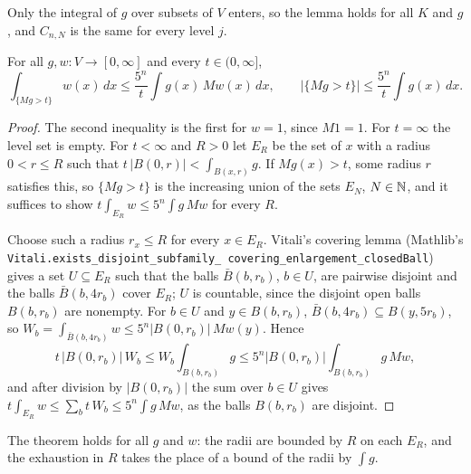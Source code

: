 Only the integral of $g$ over subsets of $V$ enters, so the lemma holds for all $K$ and $g$, and
$C_{n,N}$ is the same for every level $j$.

\begin{theorem}
\label{thm:maximal-weak-type}
\leanok
{}
For all $g, w : V \to [0, \infty]$ and every $t \in (0, \infty]$,
\[
  \int_{\{M g > t\}} w(x) \, dx \leq \frac{5^n}{t} \int g(x) \, M w(x) \, dx,
  \qquad
  |\{M g > t\}| \leq \frac{5^n}{t} \int g(x) \, dx .
\]
\end{theorem}

\begin{proof}
\leanok
The second inequality is the first for $w = 1$, since $M 1 = 1$. For $t = \infty$ the level set
is empty. For $t < \infty$ and $R > 0$ let $E_R$ be the set of $x$ with a radius
$0 < r \leq R$ such that $t \, |B(0, r)| < \int_{B(x, r)} g$. If $M g(x) > t$, some radius
$r$ satisfies this, so $\{M g > t\}$ is the increasing union of the sets $E_N$, $N \in \mathbb{N}$, and
it suffices to show $t \int_{E_R} w \leq 5^n \int g \, M w$ for every $R$.

Choose such a radius $r_x \leq R$ for every $x \in E_R$. Vitali's covering lemma (Mathlib's
\texttt{Vitali.\allowbreak exists\_disjoint\_subfamily\_\allowbreak
covering\_enlargement\_closedBall}) gives a
set $U \subseteq E_R$ such that the balls $\bar B(b, r_b)$, $b \in U$, are pairwise disjoint and
the balls $\bar B(b, 4 r_b)$ cover $E_R$; $U$ is countable, since the disjoint open balls
$B(b, r_b)$ are nonempty. For $b \in U$ and $y \in B(b, r_b)$,
$\bar B(b, 4 r_b) \subseteq B(y, 5 r_b)$, so
$W_b = \int_{\bar B(b, 4 r_b)} w \leq 5^n |B(0, r_b)| \, M w(y)$. Hence
\[
  t \, |B(0, r_b)| \, W_b \leq W_b \int_{B(b, r_b)} g
  \leq 5^n |B(0, r_b)| \int_{B(b, r_b)} g \, M w ,
\]
and after division by $|B(0, r_b)|$ the sum over $b \in U$ gives
$t \int_{E_R} w \leq \sum_b t \, W_b \leq 5^n \int g \, M w$, as the balls $B(b, r_b)$ are
disjoint.
\end{proof}

The theorem holds for all $g$ and $w$: the radii are bounded by $R$ on each $E_R$, and the
exhaustion in $R$ takes the place of a bound of the radii by $\int g$.

